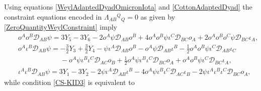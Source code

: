 \documentclass[10pt,a4paper]{article}
\theoremstyle{plain}
\begin{document}
Using equations \eqref{WeylAdaptedDyadOmicronIota} and
\eqref{CottonAdaptedDyad} the constraint equations encoded in
$\Lambda_{AB}{}^{Q}{}_{Q}=0$ as given by
\eqref{ZeroQuantityWeylConstraint} imply
\begin{subequations}
\begin{eqnarray}
&& o^{A} o^{B} \mathcal{D}_{AB}\psi = 3 Y_5 - 3 Y_6 - 2 o^{A} \psi
  \mathcal{D}_{AB}o^{B} + 4 o^{A} o^{B} \psi \iota^{C}
  \mathcal{D}_{BC}o_{A} + 2 o^{A} o^{B} o^{C} \psi
  \mathcal{D}_{BC}\iota_{A}, \label{EqA4a} \\ && o^{A} \iota^{B}
  \mathcal{D}_{AB}\psi = - \tfrac{3}{2} Y_3 + \tfrac{3}{2} Y_4 - \psi
  \iota^{A} \mathcal{D}_{AB}o^{B} - o^{A} \psi
  \mathcal{D}_{AB}\iota^{B} - \tfrac{1}{2} o^{A} o^{B} \psi \iota^{C}
  \mathcal{D}_{AB}\iota_{C} \nonumber \\ && \qquad \qquad \qquad -
  o^{A} \psi \iota^{B} \iota^{C} \mathcal{D}_{AC}o_{B} + \tfrac{1}{2}
  o^{A} \psi \iota^{B} \iota^{C} \mathcal{D}_{BC}o_{A} + o^{A} o^{B}
  \psi \iota^{C}
  \mathcal{D}_{BC}\iota_{A}, \label{EqA4b}\\ &&\iota^{A} \iota^{B}
  \mathcal{D}_{AB}\psi = 3 Y_1 - 3 Y_2 - 2 \psi \iota^{A}
  \mathcal{D}_{AB}\iota^{B} - 4 o^{A} \psi \iota^{B} \iota^{C}
  \mathcal{D}_{AC}\iota_{B} - 2 \psi \iota^{A} \iota^{B} \iota^{C}
  \mathcal{D}_{BC}o_{A}, \label{EqA4c}
\end{eqnarray}
\end{subequations}
while condition \eqref{CS-KID3} is equivalent to
\end{document}
